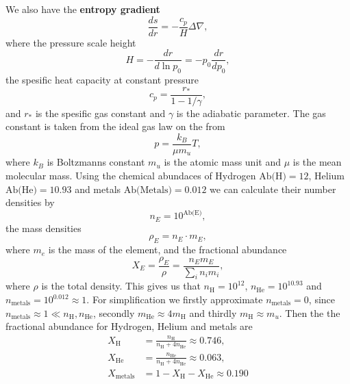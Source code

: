 We also have the \textbf{entropy gradient}
    \begin{equation*}
        \frac{ds}{dr} = -\frac{c_p}{H} \Delta\nabla,
    \end{equation*}
where the pressure scale height
    \begin{equation*}
        H = - \frac{dr}{d\ln p_0} = - p_0\frac{dr}{dp_0},
    \end{equation*}
the spesific heat capacity at constant pressure \citep{1999ApJS..121..247L}
    \begin{equation*}
        c_p = \frac{r_*}{1-1/\gamma},
    \end{equation*}
and $r_*$ is the spesific gas constant and $\gamma$ is the adiabatic parameter. The gas constant is taken from the ideal gas law on the from
    \begin{equation*}
        p = \frac{k_B}{\mu m_u} T,
    \end{equation*}
where $k_B$ is Boltzmanns constant $m_u$ is the atomic mass unit and $\mu$ is the mean molecular mass. Using the chemical abundaces of Hydrogen $\text{Ab(H)}=12$, Helium $\text{Ab(He)}=10.93$ and metals $\text{Ab(Metals)}=0.012$ \citep{2007SSRv..130..105G} we can calculate their number densities by 
    \begin{equation*}
        n_E = 10^{\text{Ab(E)}},
    \end{equation*}
the mass densities
    \begin{equation*}
        \rho_E = n_E\cdot m_E,
    \end{equation*}
where $m_e$ is the mass of the element, and the fractional abundance
    \begin{equation*}
        X_E = \frac{\rho_E}{\rho} = \frac{n_E m_E}{\sum_i n_i m_i},
    \end{equation*}
where $\rho$ is the total density. This gives us that $n_\text{H}=10^{12}$, $n_\text{He}=10^{10.93}$ and $n_\text{metals} = 10^{0.012}\approx1$. For simplification we firstly approximate $n_\text{metals}=0$, since $n_\text{metals}\approx1 \ll n_\text{H},n_\text{He}$, secondly $m_\text{He}\approx 4m_\text{H}$ and thirdly $m_\text{H}\approx m_u$. Then the the fractional abundance for Hydrogen, Helium and metals are
    \begin{align*}
        X_\text{H} &= \frac{n_\text{H}}{n_\text{H}+4 n_\text{He}} \approx 0.746,\\
        X_\text{He} &= \frac{n_\text{He}}{n_\text{H}+4n_\text{He}}\approx 0.063, \\
        X_\text{metals} &= 1 - X_{\text{H}} - X_\text{He} \approx 0.190
    \end{align*}
